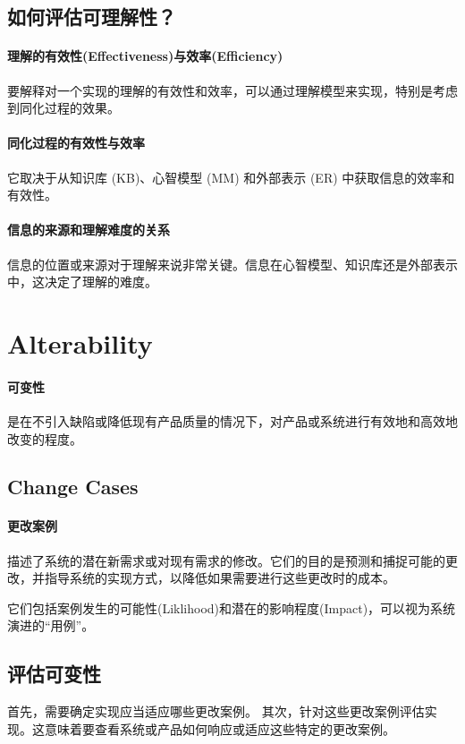 \documentclass[]{ctexbook}
\begin{document}
\subsection{如何评估可理解性？}

\paragraph{理解的有效性(Effectiveness)与效率(Efficiency)}要解释对一个实现的理解的有效性和效率，可以通过理解模型来实现，特别是考虑到同化过程的效果。

\paragraph{同化过程的有效性与效率}它取决于从知识库 (KB)、心智模型 (MM) 和外部表示 (ER) 中获取信息的效率和有效性。

\paragraph{信息的来源和理解难度的关系}信息的位置或来源对于理解来说非常关键。信息在心智模型、知识库还是外部表示中，这决定了理解的难度。

\section{Alterability}
\paragraph{可变性}是在不引入缺陷或降低现有产品质量的情况下，对产品或系统进行有效地和高效地改变的程度。

\subsection{Change Cases}
\paragraph{更改案例}描述了系统的潜在新需求或对现有需求的修改。它们的目的是预测和捕捉可能的更改，并指导系统的实现方式，以降低如果需要进行这些更改时的成本。

它们包括案例发生的可能性(Liklihood)和潜在的影响程度(Impact)，可以视为系统演进的“用例”。

\subsection{评估可变性}
首先，需要确定实现应当适应哪些更改案例。
其次，针对这些更改案例评估实现。这意味着要查看系统或产品如何响应或适应这些特定的更改案例。
\end{document}
